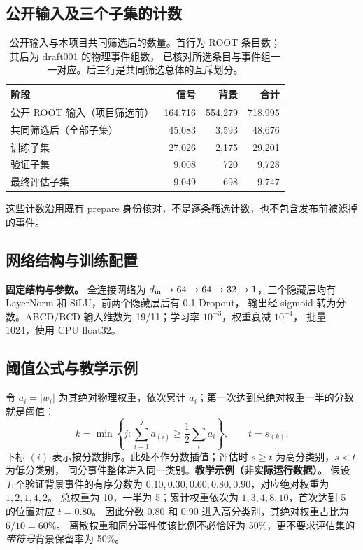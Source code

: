 \documentclass[11pt,a4paper,fontset=fandol,scheme=plain]{ctexart}
\begin{document}
\subsection{公开输入及三个子集的计数}
\begin{table}[H]
\caption{公开输入与本项目共同筛选后的数量。首行为 ROOT 条目数；其后为 draft001 的物理事件组数，
已核对所选条目与事件组一一对应。后三行是共同筛选总体的互斥划分。}
\label{tab:population}
\centering
\small
\begin{tabular}{lrrr}
\toprule
阶段 & 信号 & 背景 & 合计 \\
\midrule
公开 ROOT 输入（项目筛选前） & 164,716 & 554,279 & 718,995 \\
共同筛选后（全部子集） & 45,083 & 3,593 & 48,676 \\
\quad 训练子集 & 27,026 & 2,175 & 29,201 \\
\quad 验证子集 & 9,008 & 720 & 9,728 \\
\quad 最终评估子集 & 9,049 & 698 & 9,747 \\
\bottomrule
\end{tabular}
\end{table}
这些计数沿用既有 prepare 身份核对，不是逐条筛选计数，也不包含发布前被滤掉的事件。

\subsection{网络结构与训练配置}
\label{app:network}
\textbf{固定结构与参数。} 全连接网络为
$d_{\rm in}\to64\to64\to32\to1$，三个隐藏层均有 LayerNorm 和 SiLU，前两个隐藏层后有 0.1 Dropout，
输出经 sigmoid 转为分数。ABCD/BCD 输入维数为 19/11；学习率 $10^{-3}$，权重衰减 $10^{-4}$，
批量 1024，使用 CPU float32。
\subsection{阈值公式与教学示例}
\label{app:threshold}
令 $a_i=|w_i|$ 为其绝对物理权重，依次累计 $a_i$；第一次达到总绝对权重一半的分数就是阈值：
\[
 k=\min\left\{j:\sum_{i=1}^{j}a_{(i)}\geq\frac12\sum_i a_i\right\},
 \qquad t=s_{(k)}.
\]
下标 $(i)$ 表示按分数排序。此处不作分数插值；评估时 $s\geq t$ 为高分类别，$s<t$ 为低分类别，
同分事件整体进入同一类别。\textbf{教学示例（非实际运行数据）。} 假设五个验证背景事件的有序分数为
$0.10,0.30,0.60,0.80,0.90$，对应绝对权重为 $1,2,1,4,2$。
总权重为 10，一半为 5；累计权重依次为 $1,3,4,8,10$，首次达到 5 的位置对应 $t=0.80$。
因此分数 0.80 和 0.90 进入高分类别，其绝对权重占比为 $6/10=60\%$。
离散权重和同分事件使该比例不必恰好为 50\%，更不要求评估集的\emph{带符号}背景保留率为 50\%。
\FloatBarrier
\end{document}
